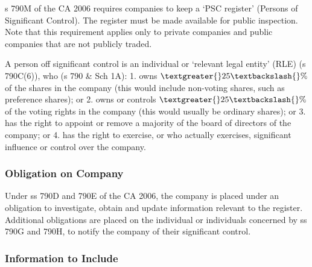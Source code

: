 \documentclass[
]{article}
\newenvironment{Shaded}{}{}
\newcommand{\NormalTok}[1]{#1}
\begin{document}
s 790M of the CA 2006 requires companies to keep a `PSC register'
(Persons of Significant Control). The register must be made available
for public inspection. Note that this requirement applies only to
private companies and public companies that are not publicly traded.

\begin{Shaded}
\begin{Highlighting}[]
\NormalTok{A person off significant control is an individual or ‘relevant legal entity’ (RLE) (s 790C(6)), who (s 790 \& Sch 1A):}
\NormalTok{1. owns $\textgreater{}25\textbackslash{}\%$ of the shares in the company (this would include non{-}voting shares, such as preference shares); or}
\NormalTok{2. owns or controls $\textgreater{}25\textbackslash{}\%$ of the voting rights in the company (this would usually be ordinary shares); or}
\NormalTok{3. has the right to appoint or remove a majority of the board of directors of the company; or}
\NormalTok{4. has the right to exercise, or who actually exercises, significant influence or control over the company.}
\end{Highlighting}
\end{Shaded}

\hypertarget{obligation-on-company}{%
\subsubsection{Obligation on Company}\label{obligation-on-company}}

Under ss 790D and 790E of the CA 2006, the company is placed under an
obligation to investigate, obtain and update information relevant to the
register. Additional obligations are placed on the individual or
individuals concerned by ss 790G and 790H, to notify the company of
their significant control.

\hypertarget{information-to-include}{%
\subsubsection{Information to Include}\label{information-to-include}}
\end{document}
